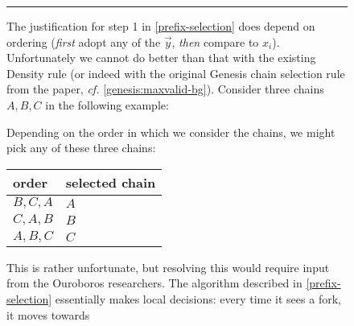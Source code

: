 \begin{figure}[p]
\hrule
\vspace{0.5em}

The justification for step 1 in \cref{prefix-selection} does depend on ordering
(\emph{first} adopt any of the $\vec{y}$, \emph{then} compare to $x_i$).
Unfortunately we cannot do better than that with the existing Density rule (or
indeed with the original Genesis chain selection rule from the paper, \emph{cf.}
\cref{genesis:maxvalid-bg}). Consider three chains $A, B, C$ in the following
example:
%
\begin{center}
\end{center}
%
Depending on the order in which we consider the chains, we might pick any of
these three chains:
%
\begin{center}
\begin{tabular}{l|l}
\textbf{order} & \textbf{selected chain} \\ \hline
$B, C, A$ & $A$ \\
$C, A, B$ & $B$ \\
$A, B, C$ & $C$ \\
\end{tabular}
\end{center}
%
This is rather unfortunate, but resolving this would require input from the
Ouroboros researchers. The algorithm described in \cref{prefix-selection}
essentially makes local decisions: every time it sees a fork, it moves towards

\end{figure}
